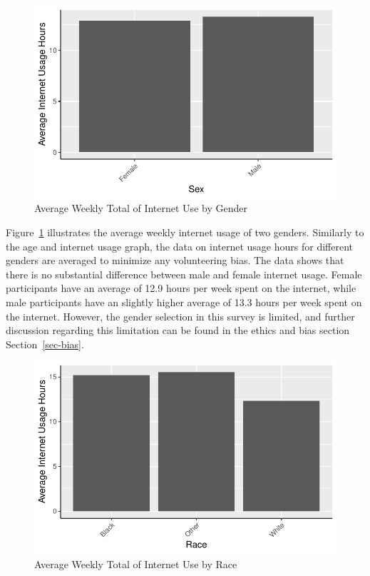 \documentclass[
  letterpaper,
  DIV=11,
  numbers=noendperiod]{scrartcl}
\begin{document}
\begin{figure}

{\centering \includegraphics{paper_files/figure-pdf/fig-genderandinternet-1.pdf}

}

\caption{\label{fig-genderandinternet}Average Weekly Total of Internet
Use by Gender}

\end{figure}

Figure~\ref{fig-genderandinternet} illustrates the average weekly
internet usage of two genders. Similarly to the age and internet usage
graph, the data on internet usage hours for different genders are
averaged to minimize any volunteering bias. The data shows that there is
no substantial difference between male and female internet usage. Female
participants have an average of 12.9 hours per week spent on the
internet, while male participants have an slightly higher average of
13.3 hours per week spent on the internet. However, the gender selection
in this survey is limited, and further discussion regarding this
limitation can be found in the ethics and bias section
Section~\ref{sec-bias}.

\begin{figure}

{\centering \includegraphics{paper_files/figure-pdf/fig-raceandinternet-1.pdf}

}

\caption{\label{fig-raceandinternet}Average Weekly Total of Internet Use
by Race}

\end{figure}
\end{document}
